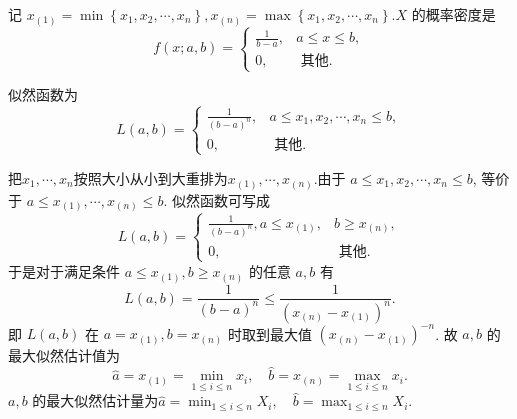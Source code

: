 \begin{solution}
    记 $x_{(1)}=\min \left\{x_1, x_2, \cdots, x_n\right\}, x_{(n)}=\max \left\{x_1, x_2, \cdots, x_n\right\} . X$ 的概率密度是
$$
f(x ; a, b)= \begin{cases}\frac{1}{b-a}, & a \leq x \leq b, \\ 0, & \text { 其他. }\end{cases}
$$

似然函数为
$$
L(a, b)= \begin{cases}\frac{1}{(b-a)^n}, & a \leq x_1, x_2, \cdots, x_n \leq b, \\ 0, & \text { 其他. }\end{cases}
$$

把$x_1, \cdots, x_n$按照大小从小到大重排为$x_{(1)}, \cdots, x_{(n)}$.由于 $a \leq x_1, x_2, \cdots, x_n \leq b$, 等价于 $a \leq x_{(1)},\cdots, x_{(n)} \leq b$. 似然函数可写成
    $$
    L(a, b)= \begin{cases}\frac{1}{(b-a)^n}, a \leq x_{(1)}, & b \geqslant x_{(n)}, \\ 0, & \text { 其他. }\end{cases}
    $$
    于是对于满足条件 $a \leq x_{(1)}, b \geqslant x_{(n)}$ 的任意 $a, b$ 有
    $$
    L(a, b)=\frac{1}{(b-a)^n} \leq \frac{1}{\left(x_{(n)}-x_{(1)}\right)^n} .
    $$
    即 $L(a, b)$ 在 $a=x_{(1)}, b=x_{(n)}$ 时取到最大值 $\left(x_{(n)}-x_{(1)}\right)^{-n}$. 故 $a, b$ 的最大似然估计值为
    $$
    \hat{a}=x_{(1)}=\min _{1 \leq i \leq n} x_i, \quad \hat{b}=x_{(n)}=\max _{1 \leq i \leq n} x_i .
    $$
    $a, b$ 的最大似然估计量为$\hat{a}=\min _{1 \leq i \leq n} X_i, \quad \hat{b}=\max _{1 \leq i \leq n} X_i .$


\end{solution}
